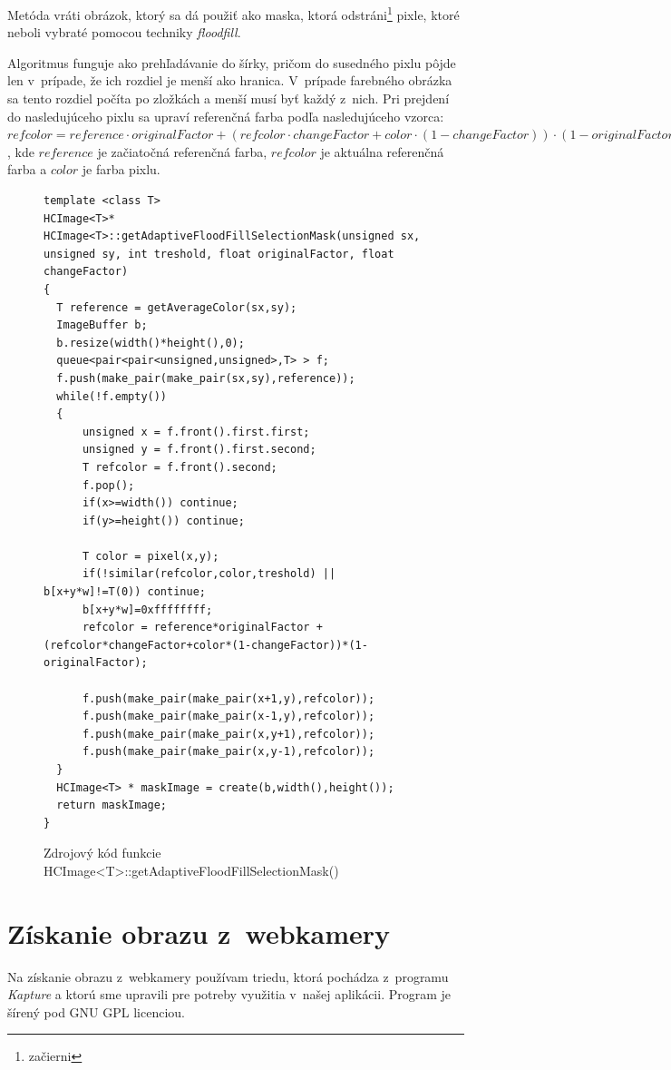 Metóda vráti obrázok, ktorý sa dá použiť ako maska, ktorá odstráni\footnote{začierni} pixle, ktoré neboli vybraté pomocou techniky \textit{floodfill}.

Algoritmus funguje ako prehľadávanie do šírky, pričom do susedného pixlu pôjde len v~prípade, že ich rozdiel je menší ako hranica. V~prípade farebného obrázka sa tento rozdiel počíta po zložkách a menší musí byť každý z~nich. Pri prejdení do nasledujúceho pixlu sa upraví referenčná farba podľa nasledujúceho vzorca: $refcolor = reference \cdot originalFactor + (refcolor\cdot changeFactor+color \cdot (1-changeFactor)) \cdot (1-originalFactor)$, kde $reference$ je začiatočná referenčná farba, $refcolor$ je aktuálna referenčná farba a $color$ je farba pixlu.

\begin{figure}[htp]
\begin{lstlisting}
template <class T>
HCImage<T>* HCImage<T>::getAdaptiveFloodFillSelectionMask(unsigned sx, unsigned sy, int treshold, float originalFactor, float changeFactor)
{
  T reference = getAverageColor(sx,sy);
  ImageBuffer b;
  b.resize(width()*height(),0);
  queue<pair<pair<unsigned,unsigned>,T> > f;
  f.push(make_pair(make_pair(sx,sy),reference));
  while(!f.empty())
  {
      unsigned x = f.front().first.first;
      unsigned y = f.front().first.second;
      T refcolor = f.front().second;
      f.pop();
      if(x>=width()) continue;
      if(y>=height()) continue;

      T color = pixel(x,y);
      if(!similar(refcolor,color,treshold) || b[x+y*w]!=T(0)) continue;
      b[x+y*w]=0xffffffff;
      refcolor = reference*originalFactor + (refcolor*changeFactor+color*(1-changeFactor))*(1-originalFactor);

      f.push(make_pair(make_pair(x+1,y),refcolor));
      f.push(make_pair(make_pair(x-1,y),refcolor));
      f.push(make_pair(make_pair(x,y+1),refcolor));
      f.push(make_pair(make_pair(x,y-1),refcolor));
  }
  HCImage<T> * maskImage = create(b,width(),height());
  return maskImage;
}\end{lstlisting}
\caption{Zdrojový kód funkcie HCImage<T>::getAdaptiveFloodFillSelectionMask()}
\label{fig:getAdaptiveFloodFillSelectionMask}
\end{figure}

\section{Získanie obrazu z~webkamery}
Na získanie obrazu z~webkamery používam triedu, ktorá pochádza z~programu \textit{Kapture} \cite{kapture} a ktorú sme upravili pre potreby využitia v~našej aplikácii. Program je šírený pod GNU GPL licenciou.

